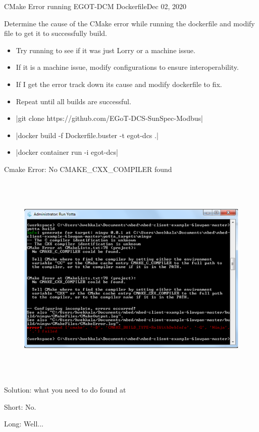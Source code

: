 \begin{entry}{CMake Error running EGOT-DCM Dockerfile}{Dec 02, 2020}
    \objective 
    
    Determine the cause of the CMake error while running the dockerfile and modify file to get it to successfully build.
    
    \outline
    
    \begin{itemize}
        \item Try running to see if it was just Lorry or a machine issue.
        \item If it is a machine issue, modify configurations to ensure interoperability.
        \item If I get the error track down its cause and modify dockerfile to fix.
        \item Repeat until all builds are successful.
    \end{itemize}
    
    \procedures
    
    \begin{itemize}
        \item {}|git clone https://github.com/EGoT-DCS-SunSpec-Modbus|
        \item {}|docker build -f Dockerfile.buster -t egot-dcs .|
        \item {}|docker container run -i egot-dcs|
    \end{itemize}
    
    \observations

    \begin{error}{Cmake Error: No CMAKE\_CXX\_COMPILER found}
        \begin{figure}[H]
            \centering
            \includegraphics[height=4in]{Fall2020/Figures/cmake_error.png}
        \end{figure}
        
        Solution: what you need to do found at \cite{CMAKE-Forum}
    \end{error}
    
    \results
    
    Short: No.
    
    Long: Well...
    

\end{entry}